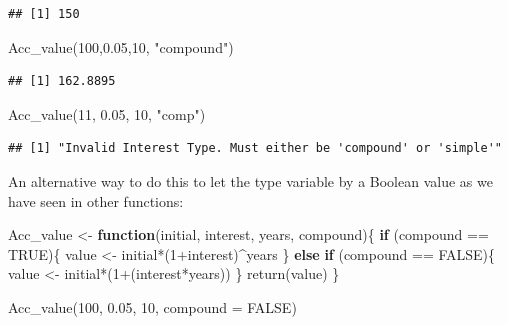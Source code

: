 \documentclass[
]{book}
\newenvironment{Shaded}{\begin{snugshade}}{\end{snugshade}}
\newcommand{\AttributeTok}[1]{\textcolor[rgb]{0.77,0.63,0.00}{#1}}
\newcommand{\ConstantTok}[1]{\textcolor[rgb]{0.00,0.00,0.00}{#1}}
\newcommand{\ControlFlowTok}[1]{\textcolor[rgb]{0.13,0.29,0.53}{\textbf{#1}}}
\newcommand{\DecValTok}[1]{\textcolor[rgb]{0.00,0.00,0.81}{#1}}
\newcommand{\FloatTok}[1]{\textcolor[rgb]{0.00,0.00,0.81}{#1}}
\newcommand{\FunctionTok}[1]{\textcolor[rgb]{0.00,0.00,0.00}{#1}}
\newcommand{\NormalTok}[1]{#1}
\newcommand{\OtherTok}[1]{\textcolor[rgb]{0.56,0.35,0.01}{#1}}
\newcommand{\SpecialCharTok}[1]{\textcolor[rgb]{0.00,0.00,0.00}{#1}}
\newcommand{\StringTok}[1]{\textcolor[rgb]{0.31,0.60,0.02}{#1}}
\theoremstyle{definition}
\theoremstyle{definition}
\theoremstyle{definition}
\theoremstyle{definition}
\theoremstyle{remark}
\begin{document}
\begin{verbatim}
## [1] 150
\end{verbatim}

\begin{Shaded}
\begin{Highlighting}[]
\FunctionTok{Acc\_value}\NormalTok{(}\DecValTok{100}\NormalTok{,}\FloatTok{0.05}\NormalTok{,}\DecValTok{10}\NormalTok{, }\StringTok{"compound"}\NormalTok{)}
\end{Highlighting}
\end{Shaded}

\begin{verbatim}
## [1] 162.8895
\end{verbatim}

\begin{Shaded}
\begin{Highlighting}[]
\FunctionTok{Acc\_value}\NormalTok{(}\DecValTok{11}\NormalTok{, }\FloatTok{0.05}\NormalTok{, }\DecValTok{10}\NormalTok{, }\StringTok{"comp"}\NormalTok{)}
\end{Highlighting}
\end{Shaded}

\begin{verbatim}
## [1] "Invalid Interest Type. Must either be 'compound' or 'simple'"
\end{verbatim}

An alternative way to do this to let the type variable by a Boolean value as we have seen in other functions:

\begin{Shaded}
\begin{Highlighting}[]
\NormalTok{Acc\_value }\OtherTok{\textless{}{-}} \ControlFlowTok{function}\NormalTok{(initial, interest, years, compound)\{}
  \ControlFlowTok{if}\NormalTok{ (compound }\SpecialCharTok{==} \ConstantTok{TRUE}\NormalTok{)\{}
\NormalTok{    value }\OtherTok{\textless{}{-}}\NormalTok{ initial}\SpecialCharTok{*}\NormalTok{(}\DecValTok{1}\SpecialCharTok{+}\NormalTok{interest)}\SpecialCharTok{\^{}}\NormalTok{years}
\NormalTok{  \} }\ControlFlowTok{else} \ControlFlowTok{if}\NormalTok{ (compound }\SpecialCharTok{==} \ConstantTok{FALSE}\NormalTok{)\{}
\NormalTok{    value }\OtherTok{\textless{}{-}}\NormalTok{ initial}\SpecialCharTok{*}\NormalTok{(}\DecValTok{1}\SpecialCharTok{+}\NormalTok{(interest}\SpecialCharTok{*}\NormalTok{years))}
\NormalTok{  \}}
  \FunctionTok{return}\NormalTok{(value)}
\NormalTok{\}}

\FunctionTok{Acc\_value}\NormalTok{(}\DecValTok{100}\NormalTok{, }\FloatTok{0.05}\NormalTok{, }\DecValTok{10}\NormalTok{, }\AttributeTok{compound =} \ConstantTok{FALSE}\NormalTok{)}
\end{Highlighting}
\end{Shaded}
\end{document}
